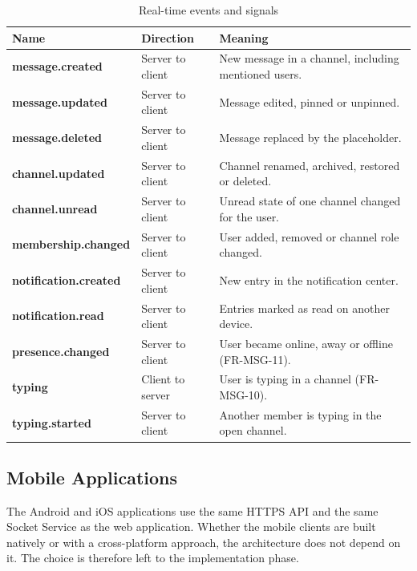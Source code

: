 \documentclass[
    english, %
]{VUMIFPSkursinis}
\begin{document}
\begin{table}[H]
\centering
\small
\caption{Real-time events and signals}
\begin{tabular}{|p{}|p{}|p{}|}
\hline
\textbf{Name} & \textbf{Direction} & \textbf{Meaning} \\ \hline
\textbf{message.created} & Server to client & New message in a channel, including mentioned users. \\ \hline
\textbf{message.updated} & Server to client & Message edited, pinned or unpinned. \\ \hline
\textbf{message.deleted} & Server to client & Message replaced by the placeholder. \\ \hline
\textbf{channel.updated} & Server to client & Channel renamed, archived, restored or deleted. \\ \hline
\textbf{channel.unread} & Server to client & Unread state of one channel changed for the user. \\ \hline
\textbf{membership.changed} & Server to client & User added, removed or channel role changed. \\ \hline
\textbf{notification.created} & Server to client & New entry in the notification center. \\ \hline
\textbf{notification.read} & Server to client & Entries marked as read on another device. \\ \hline
\textbf{presence.changed} & Server to client & User became online, away or offline (FR-MSG-11). \\ \hline
\textbf{typing} & Client to server & User is typing in a channel (FR-MSG-10). \\ \hline
\textbf{typing.started} & Server to client & Another member is typing in the open channel. \\ \hline

\end{tabular}
\end{table}

\subsection{Mobile Applications}

The Android and iOS applications use the same HTTPS API and the same Socket Service as the web application. Whether the mobile clients are built natively or with a cross-platform approach, the architecture does not depend on it. The choice is therefore left to the implementation phase.
\end{document}

